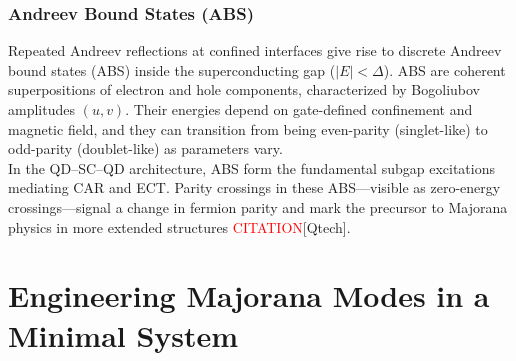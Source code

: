 \documentclass[11pt, letterpaper, titlepage]{article}
\begin{document}
\subsubsection{Andreev Bound States (ABS)}
Repeated Andreev reflections at confined interfaces give rise to discrete Andreev bound states (ABS) inside the superconducting gap ($|E|<\Delta$). ABS are coherent superpositions of electron and hole components, characterized by Bogoliubov amplitudes $(u,v)$. Their energies depend on gate-defined confinement and magnetic field, and they can transition from being even-parity (singlet-like) to odd-parity (doublet-like) as parameters vary.\\
In the QD–SC–QD architecture, ABS form the fundamental subgap excitations mediating CAR and ECT. Parity crossings in these ABS—visible as zero-energy crossings—signal a change in fermion parity and mark the precursor to Majorana physics in more extended structures \textcolor{red}{CITATION}[Qtech].

























\section{Engineering Majorana Modes in a Minimal System}
\end{document}
